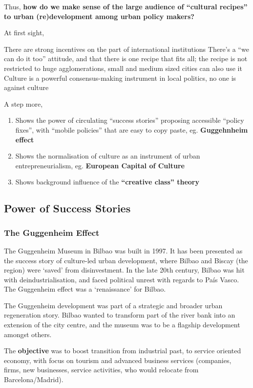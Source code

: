 \documentclass{article}
\begin{document}
Thus, \textbf{how do we make sense of the large audience of ``cultural recipes'' to urban (re)development among urban policy makers?}

At first sight, 

\begin{outline}
	\1 There are strong incentives on the part of international institutions
	\1 There's a ``we can do it too'' attitude, and that there is one recipe that fits all; the recipe is not restricted to huge agglomerations, small and medium sized cities can also use it
	\1 Culture is a powerful consensus-making instrument in local politics, no one is against culture
\end{outline}

A step more,
\begin{enumerate}
	\item Shows the power of circulating ``success stories'' proposing accessible ``policy fixes'', with ``mobile policies'' that are easy to copy paste, eg. \textbf{Guggehnheim effect}
	\item Shows the normalisation of culture as an instrument of urban entrepreneurialism, eg.  \textbf{European Capital of Culture}
	\item Shows background influence of the  \textbf{``creative class'' theory}
\end{enumerate}

\subsection{Power of Success Stories}

\subsubsection{The Guggenheim Effect}

The Guggenheim Museum in Bilbao was built in 1997.
It has been presented as the success story of culture-led urban development, where Bilbao and Biscay (the region) were `saved' from disinvestment. In the late 20th century, Bilbao was hit with deindustrialisation, and faced political unrest with regards to País Vasco. The Guggenheim effect  was a `renaissance' for Bilbao.

The Guggenheim development was part of a strategic and broader urban regeneration story. Bilbao wanted to transform part of the river bank into an extension of the city centre, and the museum was to be a flagship development amongst others.

The \textbf{objective} was to boost transition from industrial past, to service oriented economy, with focus on tourism and advanced business services (companies, firms, new businesses, service activities, who would relocate from Barcelona/Madrid).
\end{document}
